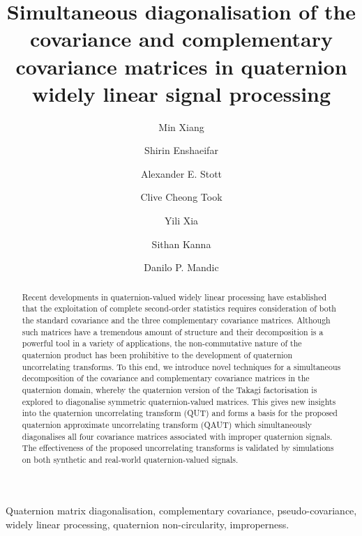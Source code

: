 \documentclass[review]{elsarticle}
\theoremstyle{plain}
\theoremstyle{remark}
\theoremstyle{plain}
\theoremstyle{definition}
\theoremstyle{prop}
\theoremstyle{definition}
\theoremstyle{plain}
\theoremstyle{plain}
\begin{document}
\begin{frontmatter}{}
\title{Simultaneous diagonalisation of the covariance and complementary covariance matrices in quaternion widely linear signal processing}
\author[address1]{Min Xiang}
\author[address2]{Shirin Enshaeifar}
\author[address1]{Alexander E. Stott}
\author[address2]{Clive Cheong Took}
\author[address3]{Yili Xia}
\author[address1]{Sithan Kanna}
\author[address1]{Danilo P. Mandic}
\address[address1]{Department
of Electrical and Electronic Engineering, Imperial College London, London SW7 2BT, UK}
\address[address2]{Department of Computer Science, the University of Surrey, Surrey GU2 7XH, UK}
\address[address3]{School of Information Science and Engineering, Southeast University, Nanjing 210018, China}


\begin{abstract}
Recent developments in quaternion-valued widely linear processing have established that the exploitation of complete second-order statistics requires consideration of both the standard covariance and the three complementary covariance matrices. Although such matrices have a tremendous amount of structure and their decomposition is a powerful tool in a variety of applications, the non-commutative nature of the quaternion product has been prohibitive to the development of quaternion uncorrelating transforms. To this end, we introduce novel techniques for a simultaneous decomposition of the covariance and complementary covariance matrices in the quaternion domain, whereby the quaternion version of the Takagi factorisation is explored to diagonalise symmetric quaternion-valued matrices. This gives new insights into the quaternion uncorrelating transform (QUT) and forms a basis for the proposed quaternion approximate uncorrelating transform (QAUT) which simultaneously diagonalises all four covariance matrices associated with improper quaternion signals. The effectiveness of the proposed uncorrelating transforms is validated by simulations on both synthetic and real-world quaternion-valued signals.
\end{abstract}
\begin{keyword}
Quaternion matrix diagonalisation, complementary covariance, pseudo-covariance, widely linear processing, quaternion non-circularity, improperness.
\end{keyword}
\end{frontmatter}{}
\end{document}
